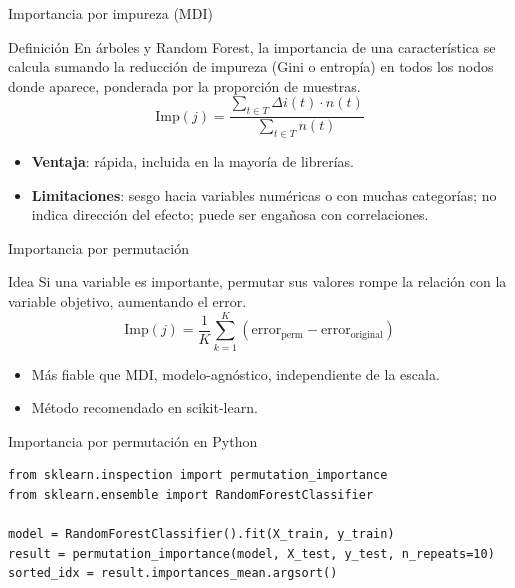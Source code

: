 \documentclass[aspectratio=169, 10pt, xcolor=table]{beamer}
\begin{document}
\begin{frame}{Importancia por impureza (MDI)}
    \begin{block}{Definición}
        En árboles y Random Forest, la importancia de una característica se calcula sumando la reducción de impureza (Gini o entropía) en todos los nodos donde aparece, ponderada por la proporción de muestras.
        \[
        \text{Imp}(j) = \frac{\sum_{t \in T} \Delta i(t) \cdot n(t)}{\sum_{t \in T} n(t)}
        \]
    \end{block}
    \begin{itemize}
        \item \textbf{Ventaja}: rápida, incluida en la mayoría de librerías.
        \item \textbf{Limitaciones}: sesgo hacia variables numéricas o con muchas categorías; no indica dirección del efecto; puede ser engañosa con correlaciones.
    \end{itemize}
\end{frame}

\begin{frame}{Importancia por permutación}
    \begin{block}{Idea}
        Si una variable es importante, permutar sus valores rompe la relación con la variable objetivo, aumentando el error.
        \[
        \text{Imp}(j) = \frac{1}{K}\sum_{k=1}^{K} (\text{error}_{\text{perm}} - \text{error}_{\text{original}})
        \]
    \end{block}
    \begin{itemize}
        \item Más fiable que MDI, modelo-agnóstico, independiente de la escala.
        \item Método recomendado en scikit-learn.
    \end{itemize}
\end{frame}

\begin{frame}[fragile]{Importancia por permutación en Python}
    \begin{lstlisting}
from sklearn.inspection import permutation_importance
from sklearn.ensemble import RandomForestClassifier

model = RandomForestClassifier().fit(X_train, y_train)
result = permutation_importance(model, X_test, y_test, n_repeats=10)
sorted_idx = result.importances_mean.argsort()
    \end{lstlisting}
\end{frame}
\end{document}
